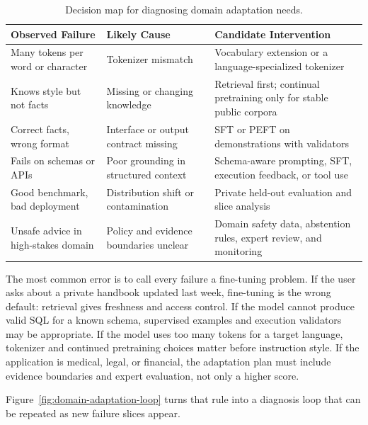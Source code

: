 \begin{table}[t]
\caption{Decision map for diagnosing domain adaptation needs.}
\label{tab:adaptation-diagnosis}
\small
\begin{tabular}{@{}p{3.1cm}p{4.2cm}p{4.5cm}@{}}
\toprule
Observed Failure & Likely Cause & Candidate Intervention \\
\midrule
Many tokens per word or character & Tokenizer mismatch & Vocabulary extension or a language-specialized tokenizer \\
Knows style but not facts & Missing or changing knowledge & Retrieval first; continual pretraining only for stable public corpora \\
Correct facts, wrong format & Interface or output contract missing & SFT or PEFT on demonstrations with validators \\
Fails on schemas or APIs & Poor grounding in structured context & Schema-aware prompting, SFT, execution feedback, or tool use \\
Good benchmark, bad deployment & Distribution shift or contamination & Private held-out evaluation and slice analysis \\
Unsafe advice in high-stakes domain & Policy and evidence boundaries unclear & Domain safety data, abstention rules, expert review, and monitoring \\
\bottomrule
\end{tabular}
\end{table}

The most common error is to call every failure a fine-tuning problem. If the user asks about a private handbook updated last week, fine-tuning is the wrong default: retrieval gives freshness and access control. If the model cannot produce valid SQL for a known schema, supervised examples and execution validators may be appropriate. If the model uses too many tokens for a target language, tokenizer and continued pretraining choices matter before instruction style. If the application is medical, legal, or financial, the adaptation plan must include evidence boundaries and expert evaluation, not only a higher score.

Figure~\ref{fig:domain-adaptation-loop} turns that rule into a diagnosis loop that can be repeated as new failure slices appear.

